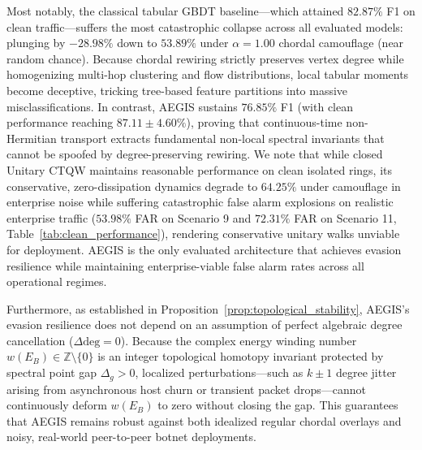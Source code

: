 \documentclass[10pt,twocolumn,letterpaper]{article}
\begin{document}
Most notably, the classical tabular GBDT baseline—which attained $82.87\%$ F1 on clean traffic—suffers the most catastrophic collapse across all evaluated models: plunging by $\mathbf{-28.98\%}$ down to $\mathbf{53.89\%}$ under $\alpha = 1.00$ chordal camouflage (near random chance). Because chordal rewiring strictly preserves vertex degree while homogenizing multi-hop clustering and flow distributions, local tabular moments become deceptive, tricking tree-based feature partitions into massive misclassifications. In contrast, AEGIS sustains $76.85\%$ F1 (with clean performance reaching $87.11 \pm 4.60\%$), proving that continuous-time non-Hermitian transport extracts fundamental non-local spectral invariants that cannot be spoofed by degree-preserving rewiring. We note that while closed Unitary CTQW maintains reasonable performance on clean isolated rings, its conservative, zero-dissipation dynamics degrade to $64.25\%$ under camouflage in enterprise noise while suffering catastrophic false alarm explosions on realistic enterprise traffic ($53.98\%$ FAR on Scenario 9 and $72.31\%$ FAR on Scenario 11, Table~\ref{tab:clean_performance}), rendering conservative unitary walks unviable for deployment. AEGIS is the only evaluated architecture that achieves evasion resilience while maintaining enterprise-viable false alarm rates across all operational regimes.

Furthermore, as established in Proposition~\ref{prop:topological_stability}, AEGIS's evasion resilience does not depend on an assumption of perfect algebraic degree cancellation ($\Delta \mathrm{deg} = 0$). Because the complex energy winding number $w(E_B) \in \mathbb{Z} \setminus \{0\}$ is an integer topological homotopy invariant protected by spectral point gap $\Delta_g > 0$, localized perturbations—such as $k \pm 1$ degree jitter arising from asynchronous host churn or transient packet drops—cannot continuously deform $w(E_B)$ to zero without closing the gap. This guarantees that AEGIS remains robust against both idealized regular chordal overlays and noisy, real-world peer-to-peer botnet deployments.
\end{document}
